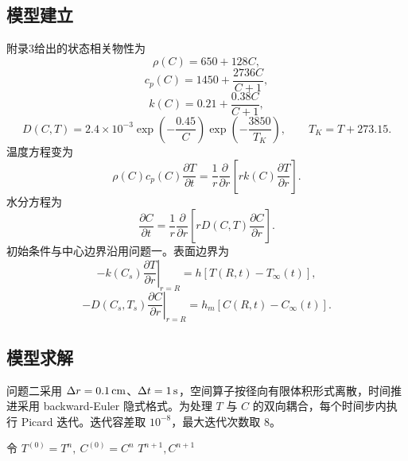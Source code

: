 \documentclass[UTF8,a4paper,12pt]{ctexart}
\numberwithin{equation}{section}
\begin{document}
\subsection{模型建立}
附录3给出的状态相关物性为
\begin{equation}
  \rho(C)=650+128C,
\end{equation}
\begin{equation}
  c_p(C)=1450+\frac{2736C}{C+1},
\end{equation}
\begin{equation}
  k(C)=0.21+\frac{0.38C}{C+1},
\end{equation}
\begin{equation}
  D(C,T)=2.4\times10^{-3}\exp\left(-\frac{0.45}{C}\right)
  \exp\left(-\frac{3850}{T_K}\right),\qquad T_K=T+273.15.
\end{equation}
温度方程变为
\begin{equation}
  \rho(C)c_p(C)\frac{\partial T}{\partial t}
  =\frac1r\frac{\partial}{\partial r}
  \left[rk(C)\frac{\partial T}{\partial r}\right].
\end{equation}
水分方程为
\begin{equation}
  \frac{\partial C}{\partial t}
  =\frac1r\frac{\partial}{\partial r}
  \left[rD(C,T)\frac{\partial C}{\partial r}\right].
\end{equation}
初始条件与中心边界沿用问题一。表面边界为
\begin{equation}
  -k(C_s)\left.\frac{\partial T}{\partial r}\right|_{r=R}
  =h\left[T(R,t)-T_\infty(t)\right],
\end{equation}
\begin{equation}
  -D(C_s,T_s)\left.\frac{\partial C}{\partial r}\right|_{r=R}
  =h_m\left[C(R,t)-C_\infty(t)\right].
\end{equation}

\subsection{模型求解}
问题二采用 $\Delta r=0.1\rm\,cm$、$\Delta t=1\rm\,s$，空间算子按径向有限体积形式离散，时间推进采用 backward-Euler 隐式格式。为处理 $T$ 与 $C$ 的双向耦合，每个时间步内执行 Picard 迭代。迭代容差取 $10^{-8}$，最大迭代次数取 8。

\begin{algorithm}[H]
  \SetAlgoLined
  令 $T^{(0)}=T^n,\ C^{(0)}=C^n$\;
  \Return $T^{n+1},C^{n+1}$\;
  \caption{问题二单时间步 Picard 耦合迭代}
\end{algorithm}
\end{document}
